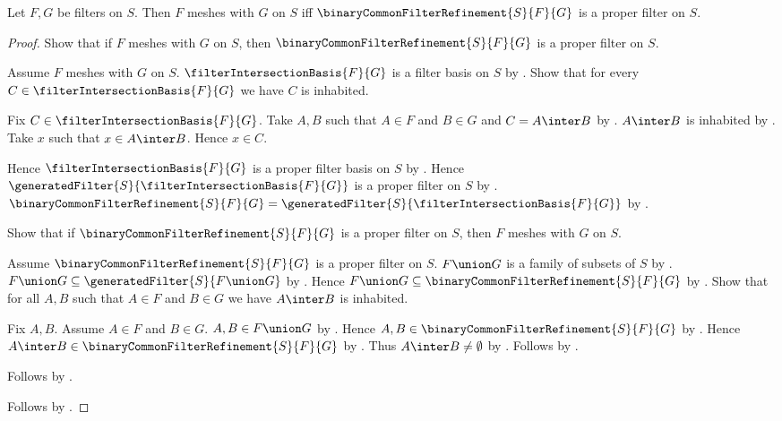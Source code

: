\begin{theorem}\label{filters_mesh_iff_common_refinement_proper}
    Let $F,G$ be filters on $S$.
    Then $F$ meshes with $G$ on $S$ iff
        $\binaryCommonFilterRefinement{S}{F}{G}$ is a proper filter on $S$.
\end{theorem}
\begin{proof}
    Show that if $F$ meshes with $G$ on $S$, then
        $\binaryCommonFilterRefinement{S}{F}{G}$ is a proper filter on $S$.
    \begin{subproof}
        Assume $F$ meshes with $G$ on $S$.
        $\filterIntersectionBasis{F}{G}$ is a filter basis on $S$ by
            .
        Show that for every $C\in\filterIntersectionBasis{F}{G}$ we have
            $C$ is inhabited.
        \begin{subproof}
            Fix $C\in\filterIntersectionBasis{F}{G}$.
            Take $A,B$ such that $A\in F$ and $B\in G$ and $C=A\inter B$ by
                .
            $A\inter B$ is inhabited by .
            Take $x$ such that $x\in A\inter B$.
            Hence $x\in C$.
        \end{subproof}
        Hence $\filterIntersectionBasis{F}{G}$ is a proper filter basis on
            $S$ by .
        Hence $\generatedFilter{S}{\filterIntersectionBasis{F}{G}}$
            is a proper filter on $S$ by
            .
        $\binaryCommonFilterRefinement{S}{F}{G}
            =\generatedFilter{S}{\filterIntersectionBasis{F}{G}}$ by
            .
    \end{subproof}

    Show that if $\binaryCommonFilterRefinement{S}{F}{G}$ is a proper filter
        on $S$, then $F$ meshes with $G$ on $S$.
    \begin{subproof}
        Assume $\binaryCommonFilterRefinement{S}{F}{G}$ is a proper filter
            on $S$.
        $F\union G$ is a family of subsets of $S$ by
            .
        $F\union G\subseteq\generatedFilter{S}{F\union G}$ by
            .
        Hence $F\union G\subseteq
            \binaryCommonFilterRefinement{S}{F}{G}$ by
            .
        Show that for all $A,B$ such that $A\in F$ and $B\in G$
            we have $A\inter B$ is inhabited.
        \begin{subproof}
            Fix $A,B$.
            Assume $A\in F$ and $B\in G$.
            $A,B\in F\union G$ by .
            Hence $A,B\in\binaryCommonFilterRefinement{S}{F}{G}$ by
                .
            Hence $A\inter B\in\binaryCommonFilterRefinement{S}{F}{G}$ by
                .
            Thus $A\inter B\neq\emptyset$ by .
            Follows by .
        \end{subproof}
        Follows by .
    \end{subproof}
    Follows by \auto.
\end{proof}

